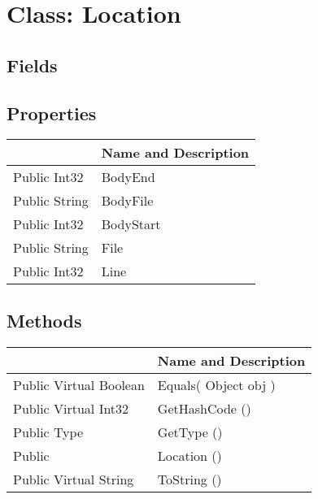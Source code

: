 \documentclass[11pt, oneside, a4paper]{book}
\begin{document}
\hypertarget{SoftwareEngineeringTools.{}Documentation.{}Location}{}
\section{Class: Location}

\subsection{Fields}

\subsection{Properties}
\begin{center}
\begin{tabular}{| p{3cm} | p{12cm} | }
\hline
\textbf{ } & \textbf{ Name and Description}\\
\hline
 Public  Int32 &  BodyEnd\hypertarget{SoftwareEngineeringTools.{}Documentation.{}Location.{}BodyEnd}{}\\
\hline
 Public  String &  BodyFile\hypertarget{SoftwareEngineeringTools.{}Documentation.{}Location.{}BodyFile}{}\\
\hline
 Public  Int32 &  BodyStart\hypertarget{SoftwareEngineeringTools.{}Documentation.{}Location.{}BodyStart}{}\\
\hline
 Public  String &  File\hypertarget{SoftwareEngineeringTools.{}Documentation.{}Location.{}File}{}\\
\hline
 Public  Int32 &  Line\hypertarget{SoftwareEngineeringTools.{}Documentation.{}Location.{}Line}{}\\
\hline
\end{tabular}
\end{center}

\subsection{Methods}
\begin{center}
\begin{tabular}{| p{3cm} | p{12cm} | }
\hline
\textbf{ } & \textbf{ Name and Description}\\
\hline
 Public  Virtual  Boolean &  Equals(\hypertarget{SoftwareEngineeringTools.{}Documentation.{}Location.{}Equals\_Object}{} Object  obj  )\\
\hline
 Public  Virtual  Int32 &  GetHashCode ()\hypertarget{SoftwareEngineeringTools.{}Documentation.{}Location.{}GetHashCode}{}\\
\hline
 Public  Type &  GetType ()\hypertarget{SoftwareEngineeringTools.{}Documentation.{}Location.{}GetType}{}\\
\hline
 Public  &  Location ()\hypertarget{SoftwareEngineeringTools.{}Documentation.{}Location.{}Location}{}\\
\hline
 Public  Virtual  String &  ToString ()\hypertarget{SoftwareEngineeringTools.{}Documentation.{}Location.{}ToString}{}\\
\hline
\end{tabular}
\end{center}
 
\end{document}
